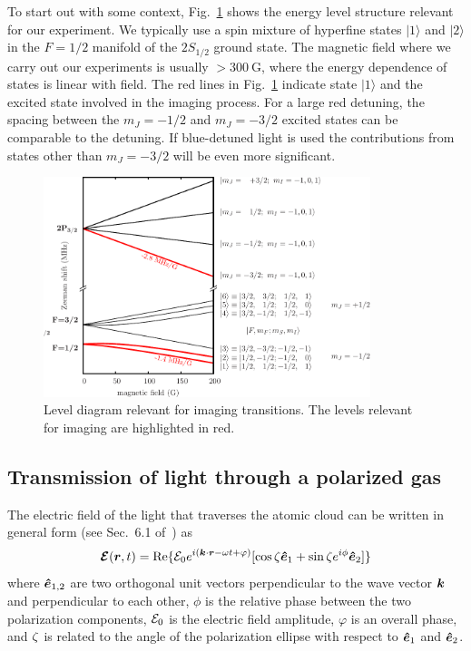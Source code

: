 To start out with some context, Fig.~\ref{fig:levels} shows the energy level
structure relevant for our experiment.   We typically use a spin mixture of
hyperfine states $|1\rangle$ and $|2\rangle$ in the $F=1/2$ manifold of the
$2S_{1/2}$ ground state.   The magnetic field where we carry out our
experiments is usually $>300~$G, where the energy dependence of states is
linear with field.   The red lines in Fig.~\ref{fig:levels} indicate state
$|1\rangle$ and the excited state involved in  the imaging process. For a large
red detuning, the spacing between the $m_{J}=-1/2$ and $m_{J}=-3/2$ excited
states can be comparable to the detuning.   If blue-detuned light is used the
contributions from states other than $m_{J}=-3/2$ will be even more
significant. 
\begin{figure}
\centering
\includegraphics[width=0.85\textwidth]{../figures/phasecon/01eps.pdf}
\caption[Levels relevant for imaging.]{Level diagram relevant for imaging
transitions.  The levels relevant for imaging are highlighted in red. }
\label{fig:levels}
\end{figure}

 
\subsection{Transmission of light through a polarized gas} 

The electric field of the light that traverses the atomic cloud can be written
in general form (see Sec.~6.1 of~\cite{auzinsh2010optically}) as 
\begin{equation}
 \bm{\mathcal{E}}( \bm{r}, t ) = 
     \text{Re}\lbrace \mathcal{E}_{0} e^{i(\bm{k}\cdot\bm{r} - \omega t + \varphi )} 
     [ \cos\zeta \bm{\hat{e}}_{1} 
   +   \sin\zeta e^{i\phi} \bm{\hat{e}}_{2} ] \rbrace 
  \label{eq:efield-param}
\end{equation}
where $\bm{\hat{e}}_{1,2}$ are two orthogonal unit vectors perpendicular to the
wave vector $\bm{k}$ and perpendicular to each other, $\phi$ is the relative
phase between the two polarization components,  $\mathcal{E}_{0}$ is the electric
field amplitude, $\varphi$ is an overall phase,  and $\zeta$ is related to
the angle of the polarization ellipse with respect to $\bm{\hat{e}}_{1}$ and
$\bm{\hat{e}}_{2}$. 

